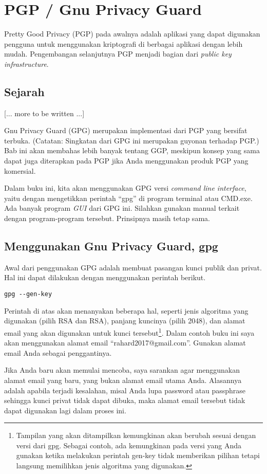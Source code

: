 \chapter{PGP / Gnu Privacy Guard}
Pretty Good Privacy (PGP) pada awalnya adalah aplikasi yang dapat digunakan
pengguna untuk menggunakan kriptografi di berbagai aplikasi dengan lebih mudah.
Pengembangan selanjutnya PGP menjadi bagian dari {\em public key
infrastructure}.

\section{Sejarah}
[... more to be written ...]

Gnu Privacy Guard (GPG) merupakan implementasi dari PGP yang bersifat terbuka.
(Catatan: Singkatan dari GPG ini merupakan guyonan terhadap PGP.) Bab ini akan
membahas lebih banyak tentang GGP, meskipun konsep yang sama dapat juga
diterapkan pada PGP jika Anda menggunakan produk PGP yang komersial.

Dalam buku ini, kita akan menggunakan GPG versi {\em command line interface},
yaitu dengan mengetikkan perintah ``gpg'' di program terminal atau CMD.exe.
Ada banyak program {\em GUI} dari GPG ini. Silahkan gunakan manual terkait
dengan program-program tersebut. Prinsipnya masih tetap sama.

\section{Menggunakan Gnu Privacy Guard, gpg}
Awal dari penggunakan GPG adalah membuat pasangan kunci publik dan privat. Hal
ini dapat dilakukan dengan menggunakan perintah berikut.

\begin{verbatim}
gpg --gen-key
\end{verbatim}

Perintah di atas akan menanyakan beberapa hal, seperti jenis algoritma yang
digunakan (pilih RSA dan RSA), panjang kuncinya (pilih 2048), dan alamat email
yang akan digunakan untuk kunci tersebut\footnote{Tampilan yang akan 
ditampilkan kemungkinan akan berubah sesuai dengan versi dari gpg. 
Sebagai contoh, ada kemungkinan pada versi yang Anda
gunakan ketika melakukan perintah gen-key tidak memberikan pilihan tetapi
langsung memilihkan jenis algoritma yang digunakan.}.
Dalam contoh buku ini saya akan
menggunakan alamat email ``rahard2017@gmail.com''. Gunakan alamat email Anda
sebagai penggantinya.

Jika Anda baru akan memulai mencoba, saya sarankan agar menggunakan alamat
email yang baru, yang bukan alamat email utama Anda.
Alasannya adalah apabila terjadi kesalahan, misal Anda lupa password atau
passphrase sehingga kunci privat tidak dapat dibuka, maka alamat email
tersebut tidak dapat digunakan lagi dalam proses ini.

